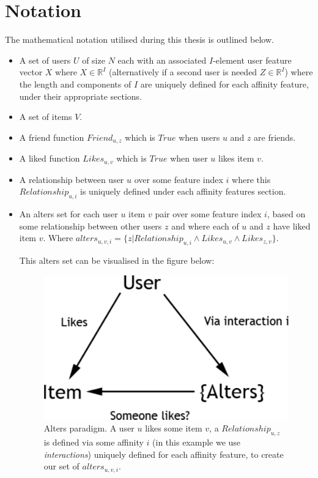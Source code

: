 \section{Notation}
\label{sec:notation}

The mathematical notation utilised during this thesis is outlined below.

\begin{itemize}
\item A set of users $U$ of size $N$ each with an associated $I$-element user feature vector $X$ where $X \in \mathbb{R}^I$ (alternatively if a second user is needed $Z \in \mathbb{R}^I$) 
where the length and components of $I$ are uniquely defined for each affinity feature, under their appropriate sections.
\item A set of items $V$.
\item A friend function $Friend_{u,z}$ which is $True$ when users $u$ and $z$ are friends.
\item A liked function $Likes_{u,v}$ which is $True$ when user $u$ likes item $v$.
\item A relationship between user $u$ over some feature index $i$ where this $Relationship_{u,i}$ is uniquely defined under each affinity features section.
\item An alters set for each user $u$ item $v$ pair over some feature index $i$, based on some relationship between other users $z$ and where each of $u$ and $z$ have liked item $v$. 
Where $alters_{u,v,i} = \{z | Relationship_{u,i} \wedge Likes_{u,v} \wedge Likes_{z,v}\}$.

\clearpage
This alters set can be visualised in the figure below:

\begin{figure}[tbh!]
	\begin{center}
		\includegraphics[scale=0.60]{imgs/alters.pdf}
		\caption{Alters paradigm. A user $u$ likes some item $v$, a $Relationship_{u,z}$ is defined via some affinity $i$ (in this example we use \emph{interactions}) uniquely defined
		for each affinity feature, to create our set of $alters_{u,v,i}$.}
	\end{center}
\end{figure}


\end{itemize}
